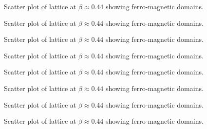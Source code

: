 \documentclass[a4paper]{article}
\begin{document}
\clearpage
\begin{figure}[ht!]
	\centering
	
	\caption{Scatter plot of lattice at $\beta\approx0.44$ showing ferro-magnetic domains.}\label{Fig_mag_plot_250_1}
\end{figure}

\clearpage
\begin{figure}[ht!]
	\centering
	
	\caption{Scatter plot of lattice at $\beta\approx0.44$ showing ferro-magnetic domains.}\label{Fig_mag_plot_350_1}
\end{figure}

\clearpage
\begin{figure}[ht!]
	\centering
	
	\caption{Scatter plot of lattice at $\beta\approx0.44$ showing ferro-magnetic domains.}\label{Fig_mag_plot_450_1}
\end{figure}

\clearpage
\begin{figure}[ht!]
	\centering
	
	\caption{Scatter plot of lattice at $\beta\approx0.44$ showing ferro-magnetic domains.}\label{Fig_mag_plot_550_1}
\end{figure}

\clearpage
\begin{figure}[ht!]
	\centering
	
	\caption{Scatter plot of lattice at $\beta\approx0.44$ showing ferro-magnetic domains.}\label{Fig_mag_plot_650_1}
\end{figure}

\clearpage
\begin{figure}[ht!]
	\centering
	
	\caption{Scatter plot of lattice at $\beta\approx0.44$ showing ferro-magnetic domains.}\label{Fig_mag_plot_750_1}
\end{figure}

\clearpage
\begin{figure}[ht!]
	\centering
	
	\caption{Scatter plot of lattice at $\beta\approx0.44$ showing ferro-magnetic domains.}\label{Fig_mag_plot_850_1}
\end{figure}

\clearpage
\begin{figure}[ht!]
	\centering
	
	\caption{Scatter plot of lattice at $\beta\approx0.44$ showing ferro-magnetic domains.}\label{Fig_mag_plot_1500_1}
\end{figure}
\end{document}
